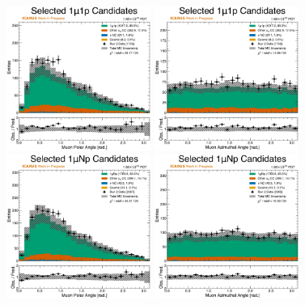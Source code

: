 \begin{figure}
    \centering
    \includegraphics[width=0.42\textwidth]{figures/data_mc_comparisons/datamc_hist1d_1mu1p_muon_polar_angle.pdf}
    \includegraphics[width=0.42\textwidth]{figures/data_mc_comparisons/datamc_hist1d_1mu1p_muon_azimuthal_angle.pdf}
    \\
    \includegraphics[width=0.42\textwidth]{figures/data_mc_comparisons/datamc_hist1d_1muNp_muon_polar_angle.pdf}
    \includegraphics[width=0.42\textwidth]{figures/data_mc_comparisons/datamc_hist1d_1muNp_muon_azimuthal_angle.pdf}

\end{figure}
